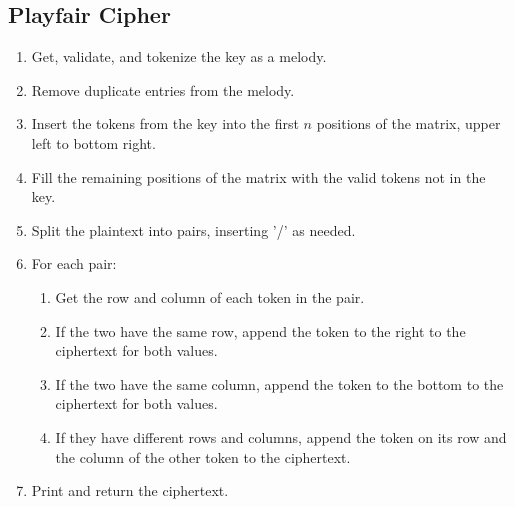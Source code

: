 \documentclass[14pt]{article}
\begin{document}
    	\subsection{Playfair Cipher}
        \begin{enumerate}
            \item Get, validate, and tokenize the key as a melody.
            \item Remove duplicate entries from the melody.
            \item Insert the tokens from the key into the first $n$ positions of the matrix, upper left to bottom right.
            \item Fill the remaining positions of the matrix with the valid tokens not in the key.
            \item Split the plaintext into pairs, inserting '/' as needed.
            \item For each pair:
                \begin{enumerate}
                    \item Get the row and column of each token in the pair.
                    \item If the two have the same row, append the token to the right to the ciphertext for both values.
                    \item If the two have the same column, append the token to the bottom to the ciphertext for both values.
                    \item If they have different rows and columns, append the token on its row and the column of the other token to the ciphertext.
                \end{enumerate}
            \item Print and return the ciphertext.
        \end{enumerate}
        
\end{document}

